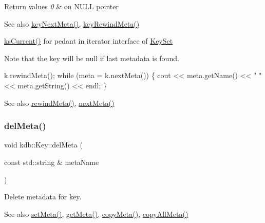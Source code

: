 \begin{DoxyRetVals}{Return values}
{\em 0} & on N\+U\+LL pointer \\
\hline
\end{DoxyRetVals}
\begin{DoxySeeAlso}{See also}
\hyperlink{group__keymeta_ga4c88342f580a4291455a801af71ce048}{key\+Next\+Meta()}, \hyperlink{group__keymeta_ga5dbb669802eea27e106ee3a5e39717a9}{key\+Rewind\+Meta()}

\hyperlink{group__keyset_ga4287b9416912c5f2ab9c195cb74fb094}{ks\+Current()} for pedant in iterator interface of \hyperlink{classkdb_1_1KeySet}{Key\+Set}
\end{DoxySeeAlso}
\begin{DoxyNote}{Note}
that the key will be null if last metadata is found.
\end{DoxyNote}

\begin{DoxyCode}
k.rewindMeta();
\textcolor{keywordflow}{while} (meta = k.nextMeta())
\{
        cout << meta.getName() << \textcolor{stringliteral}{" "} << meta.getString() << endl;
\}
\end{DoxyCode}


\begin{DoxySeeAlso}{See also}
\hyperlink{classkdb_1_1Key_a002af206119ceed17b106e2449cedc91}{rewind\+Meta()}, \hyperlink{classkdb_1_1Key_a855f37fef58a4ea4006d9e281f66cfe1}{next\+Meta()} 
\end{DoxySeeAlso}
\mbox{\label{classkdb_1_1Key_a2305da805095605aca38d53f2733fb57}} 
\subsubsection{\texorpdfstring{del\+Meta()}{delMeta()}}
{\footnotesize\ttfamily void kdb\+::\+Key\+::del\+Meta (\begin{DoxyParamCaption}\item[{const std\+::string \&}]{meta\+Name }\end{DoxyParamCaption})\hspace{0.3cm}{\ttfamily [inline]}}



Delete metadata for key. 

\begin{DoxySeeAlso}{See also}
\hyperlink{classkdb_1_1Key_a4c5a3d463127ade0b766c4298002daa3}{set\+Meta()}, \hyperlink{classkdb_1_1Key_acdd4e81b0565756c99826bf926fd6fe4}{get\+Meta()}, \hyperlink{classkdb_1_1Key_a53f6d2196a7f17c4bdc544207bdc5f4c}{copy\+Meta()}, \hyperlink{classkdb_1_1Key_aec0910bf293db33deac6a3f81359cb48}{copy\+All\+Meta()} 
\end{DoxySeeAlso}
\mbox{\label{classkdb_1_1Key_ababb1ccd9f18db379eb4a62f8db87bf5}} 
